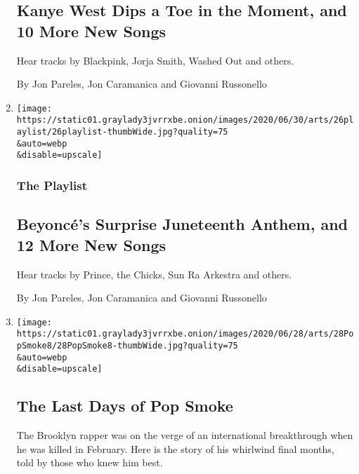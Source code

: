 \begin{enumerate}
  \hypertarget{kanye-west-dips-a-toe-in-the-moment-and-10-more-new-songs}{%
  \subsection{Kanye West Dips a Toe in the Moment, and 10 More New
  Songs}\label{kanye-west-dips-a-toe-in-the-moment-and-10-more-new-songs}}

  Hear tracks by Blackpink, Jorja Smith, Washed Out and others.

  By Jon Pareles, Jon Caramanica and Giovanni Russonello
\item
  \href{/2020/06/26/arts/music/playlist-beyonce-prince.html}{}

  \texttt{[image: https://static01.graylady3jvrrxbe.onion/images/2020/06/30/arts/26playlist/26playlist-thumbWide.jpg?quality=75\\\&auto=webp\\\&disable=upscale]}

  \hypertarget{the-playlist-4}{%
  \subsubsection{The Playlist}\label{the-playlist-4}}

  \hypertarget{beyoncuxe9s-surprise-juneteenth-anthem-and-12-more-new-songs}{%
  \subsection{Beyoncé's Surprise Juneteenth Anthem, and 12 More New
  Songs}\label{beyoncuxe9s-surprise-juneteenth-anthem-and-12-more-new-songs}}

  Hear tracks by Prince, the Chicks, Sun Ra Arkestra and others.

  By Jon Pareles, Jon Caramanica and Giovanni Russonello
\item
  \href{/2020/06/25/arts/music/pop-smoke.html}{}

  \texttt{[image: https://static01.graylady3jvrrxbe.onion/images/2020/06/28/arts/28PopSmoke8/28PopSmoke8-thumbWide.jpg?quality=75\\\&auto=webp\\\&disable=upscale]}

  \hypertarget{the-last-days-of-pop-smoke}{%
  \subsection{The Last Days of Pop
  Smoke}\label{the-last-days-of-pop-smoke}}

  The Brooklyn rapper was on the verge of an international breakthrough
  when he was killed in February. Here is the story of his whirlwind
  final months, told by those who knew him best.


\end{enumerate}
